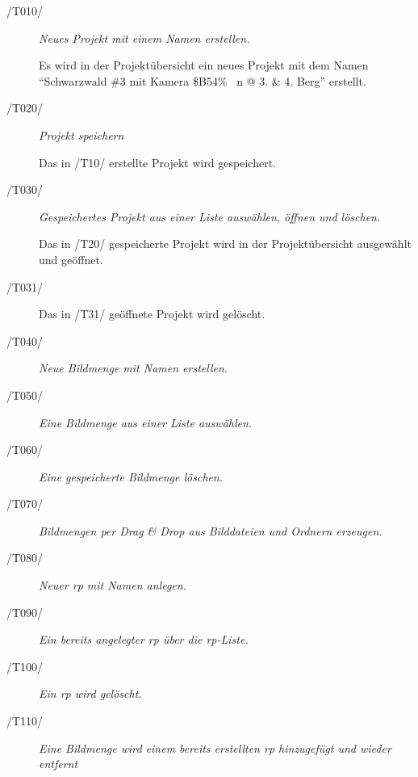 		\begin{description}
				
				\item[/T010/] \textit{Neues Projekt mit einem Namen erstellen.}\par Es wird in der Projektübersicht ein neues Projekt mit dem Namen "`Schwarzwald \#3 mit Kamera \$B54\% ~n @ 3. \& 4. Berg"' erstellt.
				
				\item[/T020/] \textit{Projekt speichern}\par Das in /T10/ erstellte Projekt wird gespeichert.
				
				\item[/T030/] \textit{Gespeichertes Projekt aus einer Liste auswählen, öffnen und löschen.}\par Das in /T20/ gespeicherte Projekt wird in der Projektübersicht ausgewählt und geöffnet.
				
				\item[/T031/]  Das in /T31/ geöffnete Projekt wird gelöscht.
				
				\item[/T040/] \textit{Neue Bildmenge mit Namen erstellen.}\par
				
				\item[/T050/] \textit{Eine Bildmenge aus einer Liste auswählen.}\par
				
				\item[/T060/] \textit{Eine gespeicherte Bildmenge löschen.}\par
				
				\item[/T070/] \textit{Bildmengen per Drag \& Drop aus Bilddateien und Ordnern erzeugen.}\par
				
				\item[/T080/] \textit{Neuer \gls{rp} mit Namen anlegen.}\par
				
				\item[/T090/] \textit{Ein bereits angelegter \gls{rp} über die \gls{rp}-Liste.}\par
				
				\item[/T100/] \textit{Ein \gls{rp} wird gelöscht.}\par
				
				\item[/T110/] \textit{Eine Bildmenge wird einem bereits erstellten \gls{rp} hinzugefügt und wieder entfernt}\par
				

\end{description}
